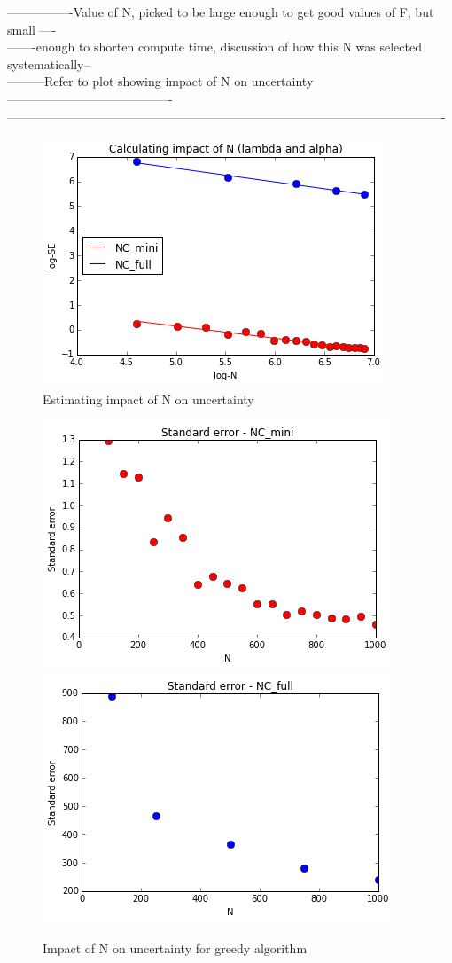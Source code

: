 \documentclass[11pt]{scrartcl} %
\begin{document}
\begin{enumerate}
----------------Value of N, picked to be large enough to get good values of F, but small ----\\
-------enough to shorten compute time, discussion of how this N was selected systematically--\\
---------Refer to plot showing impact of N on uncertainty----------------------------------------\\
----------------------------------------------------------------------------------------------------------\\
\begin{figure}
\centering
\includegraphics[width=10 cm]{LinearR}
\caption{Estimating impact of N on uncertainty}
\label{fig:LR}
\end{figure}

\begin{figure}
\centering
\includegraphics[width=10 cm]{StandardErrorVsN}
\includegraphics[width=10 cm]{StandardErrorVsNFull}
\caption{Impact of N on uncertainty for greedy algorithm}
\label{fig:StandardError}
\end{figure}


\end{enumerate}
\end{document}
